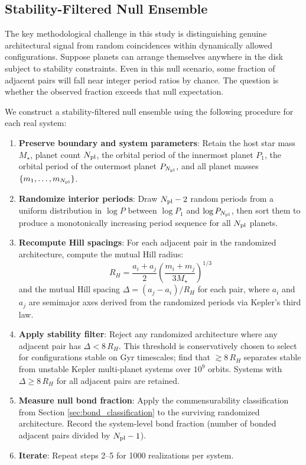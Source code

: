 \documentclass[twocolumn,usenatbib]{mnras}
\begin{document}
\subsection{Stability-Filtered Null Ensemble}
\label{sec:null_ensemble}

The key methodological challenge in this study is distinguishing genuine
architectural signal from random coincidences within dynamically allowed
configurations. Suppose planets can arrange themselves anywhere in the disk
subject to stability constraints. Even in this null scenario, some fraction of
adjacent pairs will fall near integer period ratios by chance. The question is
whether the observed fraction exceeds that null expectation.

We construct a stability-filtered null ensemble using the following procedure
for each real system:

\begin{enumerate}
  \item \textbf{Preserve boundary and system parameters}: Retain the host star
        mass $M_\star$, planet count $N_{\rm pl}$, the orbital period of the
        innermost planet $P_1$, the orbital period of the outermost planet
        $P_{N_{\rm pl}}$, and all planet masses $\{m_1,\dots,m_{N_{\rm pl}}\}$.
  \item \textbf{Randomize interior periods}: Draw $N_{\rm pl} - 2$ random
        periods from a uniform distribution in $\log P$ between $\log P_1$ and
        $\log P_{N_{\rm pl}}$, then sort them to produce a monotonically
        increasing period sequence for all $N_{\rm pl}$ planets.
  \item \textbf{Recompute Hill spacings}: For each adjacent pair in the
        randomized architecture, compute the mutual Hill radius:
        \begin{equation}
        R_H = \frac{a_i + a_j}{2}
              \left( \frac{m_i + m_j}{3 M_\star} \right)^{1/3}
        \end{equation}
        and the mutual Hill spacing $\Delta = (a_j - a_i) / R_H$ for each pair,
        where $a_i$ and $a_j$ are semimajor axes derived from the randomized
        periods via Kepler's third law.
  \item \textbf{Apply stability filter}: Reject any randomized architecture
        where any adjacent pair has $\Delta < 8\,R_H$. This threshold is
        conservatively chosen to select for configurations stable on Gyr
        timescales; \citet{puwu2015} find that $\gtrsim 8\,R_H$ separates
        stable from unstable Kepler multi-planet systems over $10^9$ orbits.
        Systems with $\Delta \geq 8\,R_H$ for all adjacent pairs are retained.
  \item \textbf{Measure null bond fraction}: Apply the commensurability
        classification from Section \ref{sec:bond_classification} to the
        surviving randomized architecture. Record the system-level bond
        fraction (number of bonded adjacent pairs divided by $N_{\rm pl} - 1$).
  \item \textbf{Iterate}: Repeat steps 2--5 for 1000 realizations per system.
\end{enumerate}
\end{document}
